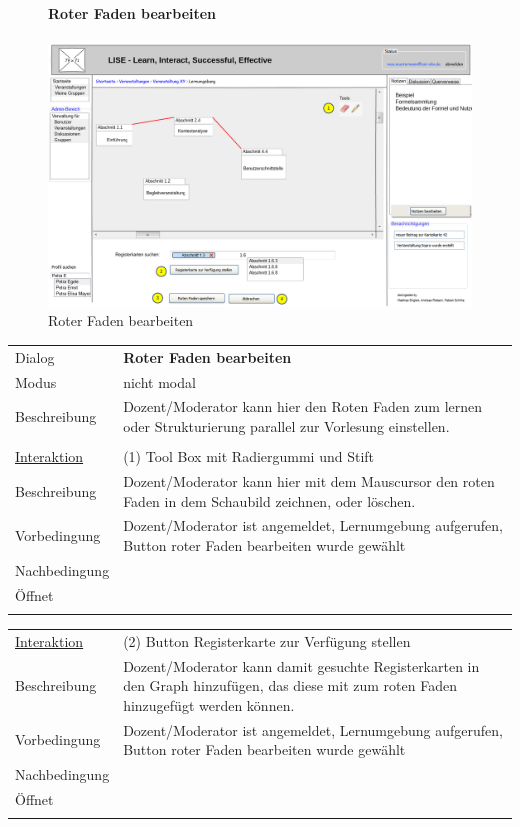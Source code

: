 \documentclass[12pt,a4paper]{article}
\begin{document}
{\begin{figure}[H]
	\paragraph{Roter Faden bearbeiten}
	\includegraphics[width=\textwidth]{Bilder/Mockups/GUI/RoterFadenBearbeiten[ModeratorAdmin].png}
	\caption{Roter Faden bearbeiten}
	\label{GuiRoterFadenBearbeiten}
\end{figure}

\begin{tabular}{l p{12cm}}
Dialog 	 		 & \textbf{Roter Faden bearbeiten} \\ 
Modus 			 & nicht modal\\ 
Beschreibung   	 & Dozent/Moderator kann hier den Roten Faden zum lernen oder Strukturierung parallel zur Vorlesung einstellen.\\\\

\underline{Interaktion} & (1) Tool Box mit Radiergummi und Stift \\ 
Beschreibung   	 		& Dozent/Moderator kann hier mit dem Mauscursor den roten Faden in dem Schaubild zeichnen, oder löschen. \\
Vorbedingung	 		& Dozent/Moderator ist angemeldet, Lernumgebung aufgerufen, Button roter Faden bearbeiten wurde gewählt\\
Nachbedingung	 		& \\
Öffnet			 		&  \\\\
\end{tabular}

\begin{tabular}{l p{12cm}}
\underline{Interaktion} & (2) Button Registerkarte zur Verfügung stellen  \\ 
Beschreibung   	 		& Dozent/Moderator kann damit gesuchte Registerkarten in den Graph hinzufügen, das diese mit zum roten Faden hinzugefügt werden können. \\
Vorbedingung	 		& Dozent/Moderator ist angemeldet, Lernumgebung aufgerufen, Button roter Faden bearbeiten wurde gewählt\\
Nachbedingung	 		& \\
Öffnet			 		& \\\\
\end{tabular}

}
\end{document}

